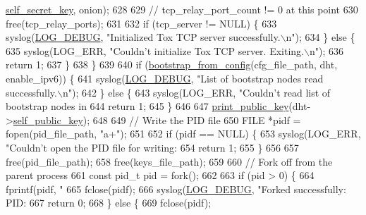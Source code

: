 \begin{DoxyCode}
{{{{{{      \hyperlink{struct_d_h_t_aa05050f86513ff53fe9da81f73c72267}{self\_secret\_key}, onion);
628 
629         \textcolor{comment}{// tcp\_relay\_port\_count != 0 at this point}
630         free(tcp\_relay\_ports);
631 
632         \textcolor{keywordflow}{if} (tcp\_server != NULL) \{
633             syslog(\hyperlink{logger_8h_aa5a9053636a30269210c54e734e0d583ab9f002c6ffbfd511da8090213227454e}{LOG\_DEBUG}, \textcolor{stringliteral}{"Initialized Tox TCP server successfully.\(\backslash\)n"});
634         \} \textcolor{keywordflow}{else} \{
635             syslog(LOG\_ERR, \textcolor{stringliteral}{"Couldn't initialize Tox TCP server. Exiting.\(\backslash\)n"});
636             \textcolor{keywordflow}{return} 1;
637         \}
638     \}
639 
640     \textcolor{keywordflow}{if} (\hyperlink{tox-bootstrapd_8c_a3b29f8b1522a8d051f35cc76a54f846a}{bootstrap\_from\_config}(cfg\_file\_path, dht, enable\_ipv6)) \{
641         syslog(\hyperlink{logger_8h_aa5a9053636a30269210c54e734e0d583ab9f002c6ffbfd511da8090213227454e}{LOG\_DEBUG}, \textcolor{stringliteral}{"List of bootstrap nodes read successfully.\(\backslash\)n"});
642     \} \textcolor{keywordflow}{else} \{
643         syslog(LOG\_ERR, \textcolor{stringliteral}{"Couldn't read list of bootstrap nodes in %
644         \textcolor{keywordflow}{return} 1;
645     \}
646 
647     \hyperlink{tox-bootstrapd_8c_adac86c780017ad2c55d81005ba02ac89}{print\_public\_key}(dht->\hyperlink{struct_d_h_t_ae726df8bdc26380e5a6c3187a00d6881}{self\_public\_key});
648 
649     \textcolor{comment}{// Write the PID file}
650     FILE *pidf = fopen(pid\_file\_path, \textcolor{stringliteral}{"a+"});
651 
652     \textcolor{keywordflow}{if} (pidf == NULL) \{
653         syslog(LOG\_ERR, \textcolor{stringliteral}{"Couldn't open the PID file for writing: %
654         \textcolor{keywordflow}{return} 1;
655     \}
656 
657     free(pid\_file\_path);
658     free(keys\_file\_path);
659 
660     \textcolor{comment}{// Fork off from the parent process}
661     \textcolor{keyword}{const} pid\_t pid = fork();
662 
663     \textcolor{keywordflow}{if} (pid > 0) \{
664         fprintf(pidf, \textcolor{stringliteral}{"%
665         fclose(pidf);
666         syslog(\hyperlink{logger_8h_aa5a9053636a30269210c54e734e0d583ab9f002c6ffbfd511da8090213227454e}{LOG\_DEBUG}, \textcolor{stringliteral}{"Forked successfully: PID: %
667         \textcolor{keywordflow}{return} 0;
668     \} \textcolor{keywordflow}{else} \{
669         fclose(pidf);
}}}}}}}}}}
\end{DoxyCode}
